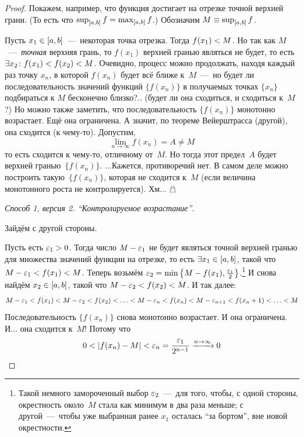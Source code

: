 \documentclass[a4paper,12pt]{article}
\begin{document}
  \begin{proof}
      Покажем, например, что функция достигает на отрезке точной верхней грани.
      (То есть что $\sup_{[a, b]} f \hm= \max_{[a, b]} f$.)
      Обозначим $M \hm\equiv \sup_{[a, b]} f$.

      Пусть $x_1 \hm\in [a, b]$~---~некоторая точка отрезка.
      Тогда $f(x_1) \hm< M$.
      Но так как $M$~---~\emph{точная} верхняя грань, то $f(x_1)$ верхней гранью являться не будет, то есть $\exists x_2\colon f(x_1) \hm< f(x_2) \hm< M$.
      Очевидно, процесс можно продолжать, находя каждый раз точку $x_n$, в которой $f(x_n)$ будет всё ближе к~$M$~---~но будет ли последовательность значений функций $\{f(x_n)\}$ в получаемых точках $\{x_n\}$ подбираться к $M$ бесконечно близко?..
      (будет ли она сходиться, и сходиться к~$M$?)
      Но можно также заметить, что последовательность $\{f(x_n)\}$ монотонно возрастает.
      Ещё она ограничена.
      А значит, по теореме Вейерштрасса (другой), она сходится (к чему-то).
      Допустим,
      \[
        \lim_{n \to \infty} f(x_n) = A \not= M
      \]
      то есть сходится к чему-то, отличному от~$M$.
      Но тогда этот предел~$A$ будет верхней гранью~$\{f(x_n)\}$.
      ...Кажется, противоречий нет.
      В самом деле можно построить такую~$\{f(x_n)\}$, которая не сходится к~$M$ (если величина монотонного роста не контролируется).
      Хм... $\mathghost$

      \medskip

      \emph{Способ 1, версия 2. ``Контролируемое возрастание''}.

      Зайдём с другой стороны.

      Пусть есть $\eps_1 \hm> 0$.
      Тогда число $M \hm- \eps_1$ не будет являться точной верхней гранью для множества значений функции на отрезке, то есть $\exists x_1 \hm\in [a, b]$, такой что $M \hm- \eps_1 \hm< f(x_1) \hm< M$.
      Теперь возьмём $\eps_2 \hm= \min\left\{M \hm- f(x_1), \frac{\eps_1}{2}\right\}$.\footnote{
        Такой немного замороченный выбор $\varepsilon_2$~---~для того, чтобы, с одной стороны, окрестность около~$M$ стала как минимум в два раза меньше; с другой~---~чтобы уже выбранная ранее $x_1$ осталась ``за бортом'', вне новой окрестности.
      }
      И снова найдём $x_2 \hm\in [a, b]$, такой что $M \hm- \eps_2 \hm< f(x_2) \hm< M$.
      И так далее:
      \[
        M - \varepsilon_1 < f(x_1) < M - \varepsilon_2 < f(x_2) < \ldots
          < M - \varepsilon_{n} < f(x_{n}) < M - \varepsilon_{n + 1} < f(x_n + 1) < \ldots < M
      \]
      Последовательность $\{f(x_n)\}$ снова монотонно возрастает.
      И она ограничена.
      И... она сходится к~$M$!
      Потому что
      \[
        0 < |f(x_n) - M| < \varepsilon_n = \frac{\varepsilon_1}{2^{n - 1}} \xrightarrow{n \to \infty} 0
      \]


\end{proof}
\end{document}
